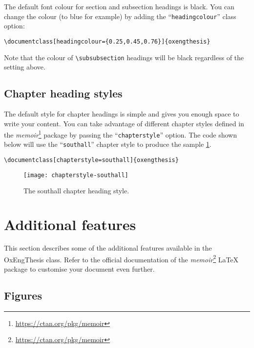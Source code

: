 The default font colour for section and subsection headings is black. You can change the colour (to blue for example) by adding the ``\verb|headingcolour|'' class option:


\begin{lstlisting}[style=custom-latex]
\documentclass[headingcolour={0.25,0.45,0.76}]{oxengthesis}
\end{lstlisting}


Note that the colour of \verb|\subsubsection| headings will be black regardless of the setting above.


\subsection{Chapter heading styles}


The default style for chapter headings is simple and gives you enough space to write your content. You can take advantage of different chapter styles defined in the \textit{memoir}\footnote{\url{https://ctan.org/pkg/memoir}} package by passing the ``\verb|chapterstyle|'' option. The code shown below will use the ``\verb|southall|'' chapter style to produce the sample \cref{fig:ch0:chapterstyle-southall}.


\begin{lstlisting}[style=custom-latex]
\documentclass[chapterstyle=southall]{oxengthesis}
\end{lstlisting}


\begin{figure}[htb]
    \centering
    \texttt{[image: chapterstyle-southall]}
    \caption[The southall chapter heading style]
    {
        The southall chapter heading style.
        \label{fig:ch0:chapterstyle-southall}
    }
\end{figure}


\section{Additional features}


This section describes some of the additional features available in the OxEngThesis class. Refer to the official documentation of the \textit{memoir}\footnote{\url{https://ctan.org/pkg/memoir}} LaTeX package to customise your document even further.


\subsection{Figures}


